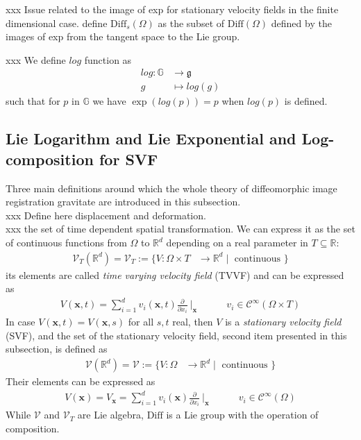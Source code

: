 xxx Issue related to the image of exp for stationary velocity fields in the finite dimensional case. define $\text{Diff}_{s}(\Omega)$ as the subset of $\text{Diff}(\Omega)$ defined by the images of exp from the tangent space to the Lie group.


xxx We define $log$ function as
\begin{align*}
log : \mathbb{G} & \longrightarrow  \mathfrak{g}    \\
g &\longmapsto log(g)
\end{align*}
such that for $p$ in $\mathbb{G}$ we have $\exp(log(p)) = p$ when $log(p)$ is defined.



\subsection{Lie Logarithm and Lie Exponential and Log-composition for SVF}

Three main definitions around which the whole theory of diffeomorphic image registration gravitate are introduced in this subsection. \\
xxx Define here displacement and deformation.\\
xxx the set of time dependent spatial transformation. We can express it as the set of continuous functions from $\Omega$ to $\mathbb{R}^{d}$ depending on a real parameter in $T\subseteq \mathbb{R}$:
\begin{align*}
\mathcal{V}_{T}(\mathbb{R}^{d}) = \mathcal{V}_{T} := \lbrace V : \Omega \times T &\longrightarrow \mathbb{R}^d \mid \text{ continuous } \rbrace 
\end{align*}
its elements are called \emph{time varying velocity field} (TVVF) and can be expressed as
\begin{align*}
V(\mathbf{x},t) = \sum_{i=1}^{d} v_{i}(\mathbf{x},t) \frac{\partial}{\partial x_{i}}~\Bigr|_{\mathbf{x}} 
\qquad 
\quad 
v_{i} \in \mathcal{C}^{\infty} (\Omega \times T)
\end{align*}
In case $V(\mathbf{x},t) = V(\mathbf{x},s)$ for all $s,t$ real, then $V$ is a \emph{stationary velocity field} (SVF), and the set of the stationary velocity field, second item presented in this subsection, is defined as
\begin{align*}
\mathcal{V}(\mathbb{R}^{d}) = \mathcal{V} := \lbrace V : \Omega &\longrightarrow \mathbb{R}^d \mid \text{ continuous } \rbrace 
\end{align*}
Their elements can be expressed as 
\begin{align*}
V(\mathbf{x}) = V_{\mathbf{x}} = \sum_{i=1}^{d} v_{i}(\mathbf{x}) \frac{\partial}{\partial x_{i}}~\Bigr|_{\mathbf{x}} \qquad \quad v_{i} \in \mathcal{C}^{\infty} (\Omega)
\end{align*}
While $\mathcal{V}$ and $\mathcal{V}_{T}$ are Lie algebra, $\text{Diff}$ is a Lie group with the operation of composition.\\

